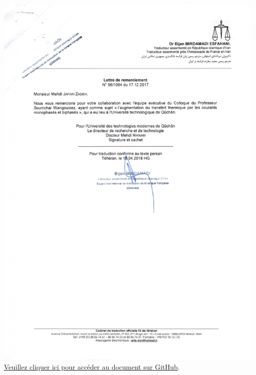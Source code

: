\documentclass{article}
\begin{document}
        \begin{center}
            \includegraphics[width=\textwidth,height=\textheight,keepaspectratio]{../Document/Certificate of Appreciation/Professor Soumchai Wangouizez Conference/17-12-2017 lettre de remerciement.jpg}
            \footnotesize
             \href{https://github.com/jafarizadeh/CV---lettre/tree/903818f42bc563b419f3283c49cc84e05cf3932d/Document/Certificate%20of%20Appreciation/Professor%20Soumchai%20Wangouizez%20Conference}{Veuillez cliquer ici pour accéder au document sur GitHub}.
        \end{center}
    \newpage

\end{document}
